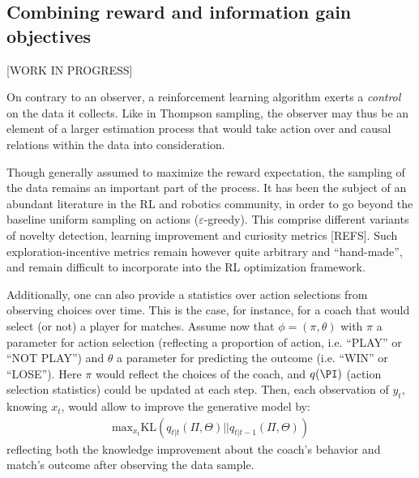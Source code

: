 \documentclass[10pt,letterpaper]{article}
\begin{document}
\subsection*{Combining reward and information gain objectives}
{\color{blue}


[WORK IN PROGRESS]




On contrary to an observer, a reinforcement learning algorithm exerts a \emph{control} on the data it collects. Like in Thompson sampling, the observer may thus be an element of a larger estimation process that would take action over and causal relations within the data into consideration. 

Though generally assumed to maximize the reward expectation, the sampling of the data remains an important part of the process. It has been the subject of an abundant literature in the RL and robotics community, in order to go beyond the baseline uniform sampling on actions ($\varepsilon$-greedy). This comprise different variants of novelty detection, learning improvement and curiosity metrics [REFS]. Such exploration-incentive metrics remain however quite arbitrary and ``hand-made'', and remain difficult to incorporate into the RL optimization framework. 


Additionally, one can also provide a statistics over action selections from observing choices over time. This is the case, for instance, for a coach that would select (or not) a player for matches. Assume now that $\phi=(\pi, \theta)$ with $\pi$ a parameter for action selection (reflecting a proportion of action, i.e. ``PLAY'' or ``NOT PLAY'') and $\theta$ a parameter for predicting the outcome (i.e. ``WIN'' or ``LOSE''). Here $\pi$ would reflect the choices of the coach, and $q(\PI)$ (action selection statistics) could be updated at each step. %
Then, each observation of $y_t$, knowing $x_t$, would allow to improve the generative model by: \begin{align}\label{eq:BS-joint}
\text{max}_{x_t}\text{KL}(q_{t|t}(\Pi, \Theta)||q_{t|t-1}(\Pi, \Theta))
\end{align}
reflecting both the knowledge improvement about the coach's  behavior and match's outcome after observing the data sample.

}
\end{document}
